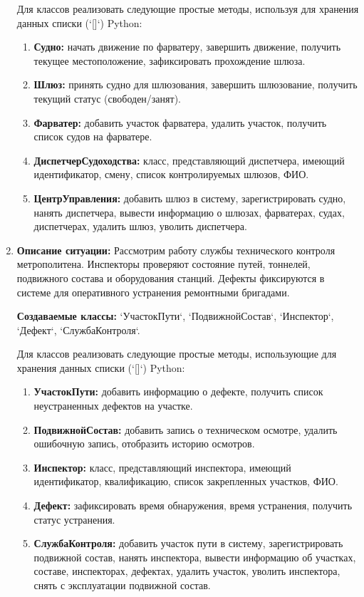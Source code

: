 \begin{enumerate}
Для классов реализовать следующие простые методы, используя для хранения данных списки (`[]`) Python:
\begin{enumerate}
    \item \textbf{Судно:} начать движение по фарватеру, завершить движение, 
    получить текущее местоположение, зафиксировать прохождение шлюза.
    \item \textbf{Шлюз:} принять судно для шлюзования, 
    завершить шлюзование, получить текущий статус (свободен/занят).
    \item \textbf{Фарватер:} добавить участок фарватера, 
    удалить участок, получить список судов на фарватере.
    \item \textbf{ДиспетчерСудоходства:} класс, представляющий диспетчера, 
    имеющий идентификатор, смену, список контролируемых шлюзов, ФИО.
    \item \textbf{ЦентрУправления:} добавить шлюз в систему, 
    зарегистрировать судно, нанять диспетчера, 
    вывести информацию о шлюзах, фарватерах, судах, диспетчерах, удалить шлюз, уволить диспетчера.
\end{enumerate}

\item \textbf{Описание ситуации:} Рассмотрим работу службы технического контроля метрополитена. 
Инспекторы проверяют состояние путей, тоннелей, подвижного состава и оборудования станций. 
Дефекты фиксируются в системе для оперативного устранения ремонтными бригадами.

\textbf{Создаваемые классы:} `УчастокПути`, `ПодвижнойСостав`, `Инспектор`, `Дефект`, `СлужбаКонтроля`.

Для классов реализовать следующие простые методы, использующие для хранения данных списки (`[]`) Python:
\begin{enumerate}
    \item \textbf{УчастокПути:} добавить информацию о дефекте, 
    получить список неустраненных дефектов на участке.
    \item \textbf{ПодвижнойСостав:} добавить запись о техническом осмотре, 
    удалить ошибочную запись, отобразить историю осмотров.
    \item \textbf{Инспектор:} класс, представляющий инспектора, 
    имеющий идентификатор, квалификацию, список закрепленных участков, ФИО.
    \item \textbf{Дефект:} зафиксировать время обнаружения, 
    время устранения, получить статус устранения.
    \item \textbf{СлужбаКонтроля:} добавить участок пути в систему, 
    зарегистрировать подвижной состав, нанять инспектора, 
    вывести информацию об участках, составе, инспекторах, дефектах, удалить участок, уволить инспектора, 
    снять с эксплуатации подвижной состав.
\end{enumerate}


\end{enumerate}
